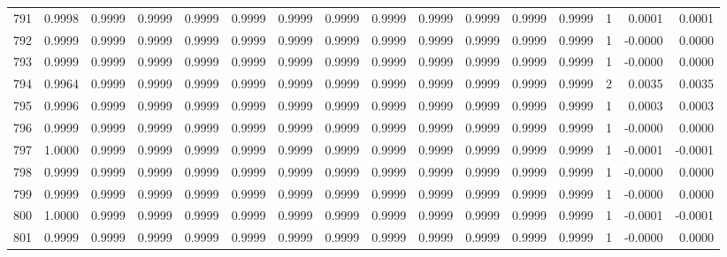 \begin{tabular}{lrrrrrrrrrrrrrrr}
791 &      0.9998 &  0.9999 &  0.9999 &  0.9999 &  0.9999 &  0.9999 &  0.9999 &  0.9999 &  0.9999 &  0.9999 &   0.9999 &     0.9999 &      1 &                    0.0001 &                     0.0001 \\
792 &      0.9999 &  0.9999 &  0.9999 &  0.9999 &  0.9999 &  0.9999 &  0.9999 &  0.9999 &  0.9999 &  0.9999 &   0.9999 &     0.9999 &      1 &                   -0.0000 &                     0.0000 \\
793 &      0.9999 &  0.9999 &  0.9999 &  0.9999 &  0.9999 &  0.9999 &  0.9999 &  0.9999 &  0.9999 &  0.9999 &   0.9999 &     0.9999 &      1 &                   -0.0000 &                     0.0000 \\
794 &      0.9964 &  0.9999 &  0.9999 &  0.9999 &  0.9999 &  0.9999 &  0.9999 &  0.9999 &  0.9999 &  0.9999 &   0.9999 &     0.9999 &      2 &                    0.0035 &                     0.0035 \\
795 &      0.9996 &  0.9999 &  0.9999 &  0.9999 &  0.9999 &  0.9999 &  0.9999 &  0.9999 &  0.9999 &  0.9999 &   0.9999 &     0.9999 &      1 &                    0.0003 &                     0.0003 \\
796 &      0.9999 &  0.9999 &  0.9999 &  0.9999 &  0.9999 &  0.9999 &  0.9999 &  0.9999 &  0.9999 &  0.9999 &   0.9999 &     0.9999 &      1 &                   -0.0000 &                     0.0000 \\
797 &      1.0000 &  0.9999 &  0.9999 &  0.9999 &  0.9999 &  0.9999 &  0.9999 &  0.9999 &  0.9999 &  0.9999 &   0.9999 &     0.9999 &      1 &                   -0.0001 &                    -0.0001 \\
798 &      0.9999 &  0.9999 &  0.9999 &  0.9999 &  0.9999 &  0.9999 &  0.9999 &  0.9999 &  0.9999 &  0.9999 &   0.9999 &     0.9999 &      1 &                   -0.0000 &                     0.0000 \\
799 &      0.9999 &  0.9999 &  0.9999 &  0.9999 &  0.9999 &  0.9999 &  0.9999 &  0.9999 &  0.9999 &  0.9999 &   0.9999 &     0.9999 &      1 &                   -0.0000 &                     0.0000 \\
800 &      1.0000 &  0.9999 &  0.9999 &  0.9999 &  0.9999 &  0.9999 &  0.9999 &  0.9999 &  0.9999 &  0.9999 &   0.9999 &     0.9999 &      1 &                   -0.0001 &                    -0.0001 \\
801 &      0.9999 &  0.9999 &  0.9999 &  0.9999 &  0.9999 &  0.9999 &  0.9999 &  0.9999 &  0.9999 &  0.9999 &   0.9999 &     0.9999 &      1 &                   -0.0000 &                     0.0000 \\

\end{tabular}
